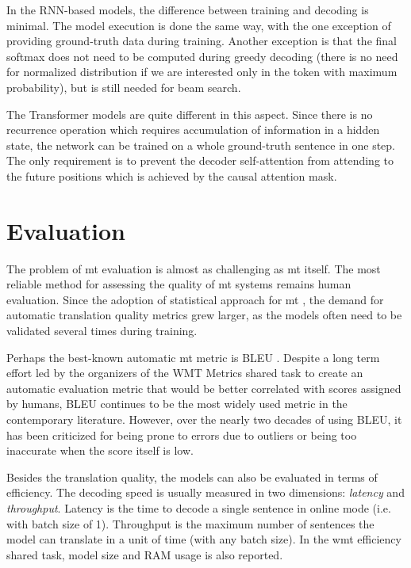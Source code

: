 In the RNN-based models, the difference between training and decoding is
minimal. The model execution is done the same way, with the one exception of
providing ground-truth data during training. Another exception is that the final
softmax does not need to be computed during greedy decoding (there is no need
for normalized distribution if we are interested only in the token with maximum
probability), but is still needed for beam search.

The Transformer models are quite different in this aspect. Since there is no
recurrence operation which requires accumulation of information in a hidden
state, the network can be trained on a whole ground-truth sentence in one step.
The only requirement is to prevent the decoder self-attention from attending to
the future positions which is achieved by the causal attention mask.

\section{Evaluation}
\label{sec:evaluation}

The problem of \ac{mt} evaluation is almost as challenging as \ac{mt} itself.
The most reliable method for assessing the quality of \ac{mt} systems remains
human evaluation.  Since the adoption of statistical approach for \ac{mt}
\citep{brown-etal-1993-mathematics,koehn-etal-2003-statistical}, the demand for
automatic translation quality metrics grew larger, as the models often need to
be validated several times during training.

Perhaps the best-known automatic \ac{mt} metric is BLEU
\citep{papineni-etal-2002-bleu}.  Despite a long term effort led by the
organizers of the WMT Metrics shared task to create an automatic evaluation
metric that would be better correlated with scores assigned by humans, BLEU
continues to be the most widely used metric in the contemporary
literature. However, over the nearly two decades of using BLEU, it has been
criticized for being prone to errors due to outliers or being too inaccurate
when the score itself is low.
\citep{callison-burch-etal-2006-evaluating,bojar-etal-2010-tackling,reiter2018structured,mathur-etal-2020-tangled}

Besides the translation quality, the models can also be evaluated in terms of
efficiency. The decoding speed is usually measured in two dimensions:
\emph{latency} and \emph{throughput}. Latency is the time to decode a single
sentence in online mode (i.e. with batch size of 1). Throughput is the maximum
number of sentences the model can translate in a unit of time (with any batch
size). In the \ac{wmt} efficiency shared task, model size and RAM usage is also
reported.


